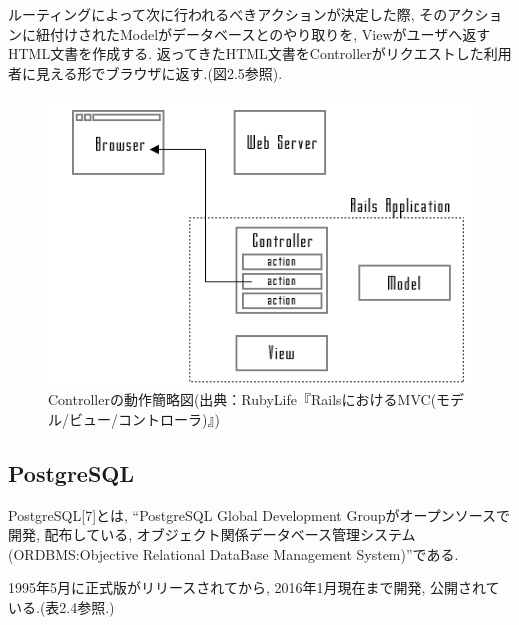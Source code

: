 \begin{itemize}
ルーティングによって次に行われるべきアクションが決定した際, そのアクションに紐付けされたModelがデータベースとのやり取りを, Viewがユーザへ返すHTML文書を作成する.
返ってきたHTML文書をControllerがリクエストした利用者に見える形でブラウザに返す.(図2.5参照).

\begin{figure}
\begin{center}
\includegraphics[width=15cm]{fig/controller.png}
\caption{Controllerの動作簡略図(出典：RubyLife『RailsにおけるMVC(モデル/ビュー/コントローラ)』)}
\end{center}
\end{figure}
\end{itemize}

\subsection{PostgreSQL}
PostgreSQL[7]とは, “PostgreSQL Global Development Groupがオープンソースで開発, 配布している, オブジェクト関係データベース管理システム(ORDBMS:Objective Relational DataBase Management System)”である.

1995年5月に正式版がリリースされてから, 2016年1月現在まで開発, 公開されている.(表2.4参照.)

